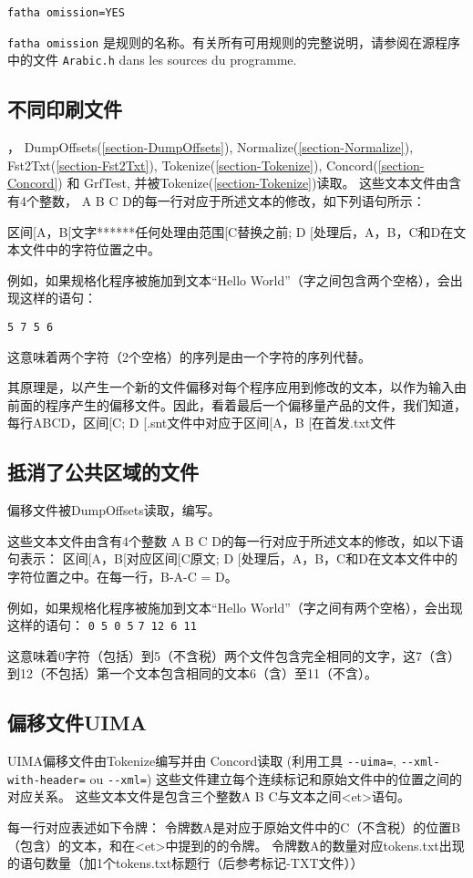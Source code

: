 \bigskip
\noindent \verb+fatha omission=YES+

\bigskip
\noindent  \verb+fatha omission+ 是规则的名称。有关所有可用规则的完整说明，请参阅在源程序中的文件 \verb+Arabic.h+ dans les sources du programme.

\subsection{不同印刷文件}
\label{subsection-offsets-diff}，
 DumpOffsets(\ref{section-DumpOffsets}), Normalize(\ref{section-Normalize}), Fst2Txt(\ref{section-Fst2Txt}), Tokenize(\ref{section-Tokenize}), Concord(\ref{section-Concord}) 和 GrfTest, 并被Tokenize(\ref{section-Tokenize})读取。
\bigskip
这些文本文件由含有4个整数， A B C D的每一行对应于所述文本的修改，如下列语句所示：

\bigskip
区间[A，B[文字******任何处理由范围[C替换之前; D [处理后，A，B，C和D在文本文件中的字符位置之中。
\bigskip

例如，如果规格化程序被施加到文本“Hello World”（字之间包含两个空格），会出现这样的语句：

\bigskip
\noindent \verb+5 7 5 6+
\bigskip

这意味着两个字符（2个空格）的序列是由一个字符的序列代替。

\bigskip

其原理是，以产生一个新的文件偏移对每个程序应用到修改的文本，以作为输入由前面的程序产生的偏移文件。因此，看着最后一个偏移量产品的文件，我们知道，每行ABCD，区间[C; D [.snt文件中对应于区间[A，B [在首发.txt文件

\subsection{抵消了公共区域的文件}
\label{subsection-offsets-common}
偏移文件被DumpOffsets读取，编写。

\bigskip
这些文本文件由含有4个整数 A B C D的每一行对应于所述文本的修改，如以下语句表示：
\bigskip
区间[A，B[对应区间[C原文; D [处理后，A，B，C和D在文本文件中的字符位置之中。在每一行，B-A-C = D。
\bigskip

例如，如果规格化程序被施加到文本“Hello World”（字之间有两个空格），会出现这样的语句：
\bigskip
\noindent \verb+0 5 0 5+
\newline
\noindent \verb+7 12 6 11+
\bigskip

这意味着0字符（包括）到5（不含税）两个文件包含完全相同的文字，这7（含）到12（不包括）第一个文本包含相同的文本6（含）至11（不含）。


\subsection{偏移文件UIMA}
\label{subsection-offsets-uima}
UIMA偏移文件由Tokenize编写并由 Concord读取 (利用工具 \verb$--uima=$, \verb$--xml-with-header=$ ou \verb$--xml=$) 这些文件建立每个连续标记和原始文件中的位置之间的对应关系。
\bigskip
这些文本文件是包含三个整数A B C与文本之间<et>语句。

\bigskip
每一行对应表述如下令牌：
令牌数A是对应于原始文件中的C（不含税）的位置B（包含）的文本，和在<et>中提到的的令牌。
令牌数A的数量对应tokens.txt出现的语句数量（加1个tokens.txt标题行（后{参考标记-TXT文件}））


\bigskip
